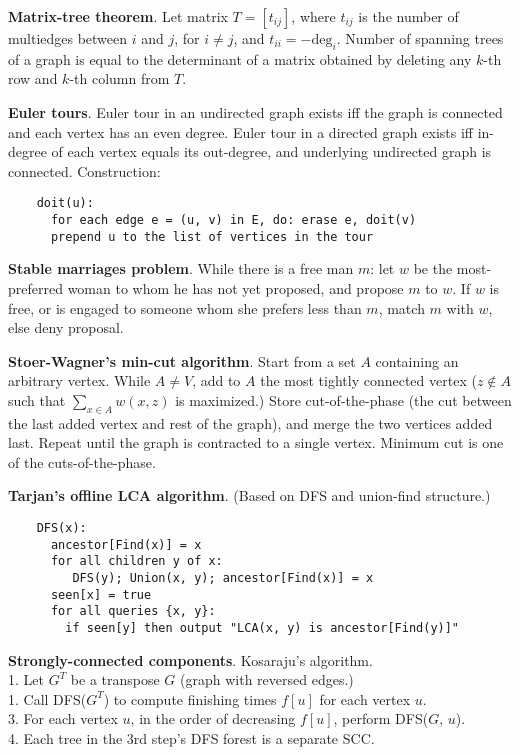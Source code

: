 \documentclass[a4paper, 12pt]{article}
\newcommand{\Topic}[1]{\textbf{#1}}
\begin{document}
\Topic{Matrix-tree theorem}.
Let matrix $T = [t_{ij}]$, where $t_{ij}$ is the number of multiedges
between $i$ and $j$, for $i \ne j$, and $t_{ii} = -\mbox{deg}_i$.
Number of spanning trees of a graph is equal to the determinant of
a matrix obtained by deleting any $k$-th row and $k$-th column from $T$.

\Topic{Euler tours}.
Euler tour in an undirected graph exists iff the graph is connected and each
vertex has an even degree.  Euler tour in a directed graph exists iff in-degree
of each vertex equals its out-degree, and underlying undirected graph is connected.
Construction:
\vspace{-5mm}
\begin{verbatim}
    doit(u):
      for each edge e = (u, v) in E, do: erase e, doit(v)
      prepend u to the list of vertices in the tour
\end{verbatim}
\vspace{-2mm}

\Topic{Stable marriages problem}.
While there is a free man $m$: let $w$ be the most-preferred woman to whom he
has not yet proposed, and propose $m$ to $w$. If $w$ is free, or is engaged to someone whom
she prefers less than $m$, match $m$ with $w$, else deny proposal.

\Topic{Stoer-Wagner's min-cut algorithm}.
Start from a set $A$ containing an arbitrary vertex.
While $A \ne V$, add to $A$ the most tightly connected vertex
($z \notin A$ such that $\sum_{x \in A} w(x, z)$ is maximized.)
Store cut-of-the-phase (the cut between the last added vertex and rest of
the graph), and merge the two vertices added last.  Repeat until the graph
is contracted to a single vertex.  Minimum cut is one of the cuts-of-the-phase.

\Topic{Tarjan's offline LCA algorithm}. (Based on DFS and union-find structure.)
\vspace{-5mm}
\begin{verbatim}
    DFS(x):
      ancestor[Find(x)] = x
      for all children y of x:
         DFS(y); Union(x, y); ancestor[Find(x)] = x
      seen[x] = true
      for all queries {x, y}:
        if seen[y] then output "LCA(x, y) is ancestor[Find(y)]"
\end{verbatim}




\Topic{Strongly-connected components}. Kosaraju's algorithm. \\
1. Let $G^T$ be a transpose $G$ (graph with reversed edges.) \\
1. Call DFS($G^T$) to compute finishing times $f[u]$ for each vertex $u$. \\
3. For each vertex $u$, in the order of decreasing $f[u]$, perform DFS($G$, $u$). \\
4. Each tree in the 3rd step's DFS forest is a separate SCC.
\end{document}

